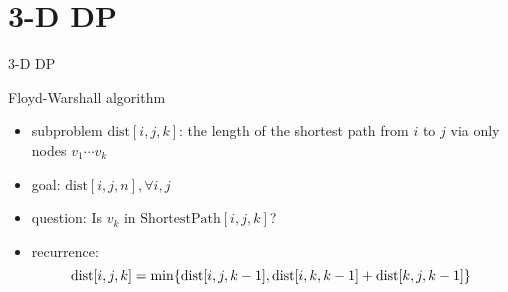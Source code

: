 \section{3-D DP}

\begin{frame}{3-D DP}
  \begin{exampleblock}{Floyd-Warshall algorithm}
    \begin{itemize}
      \item subproblem $\text{dist}[i,j,k]$: the length of the shortest path from $i$ to $j$ via only nodes $v_{1} \cdots v_{k}$
      \item goal: $\text{dist}[i,j,n], \forall i,j$
      \item question: Is $v_{k}$ in $\text{ShortestPath}[i,j,k]$?
      \item recurrence:
	\[
	  \text{dist}[i,j,k] = \min \{\text{dist}[i,j,k-1], \text{dist}[i,k,k-1] + \text{dist}[k,j,k-1]\}
	\]
    \end{itemize}
  \end{exampleblock}
\end{frame}
